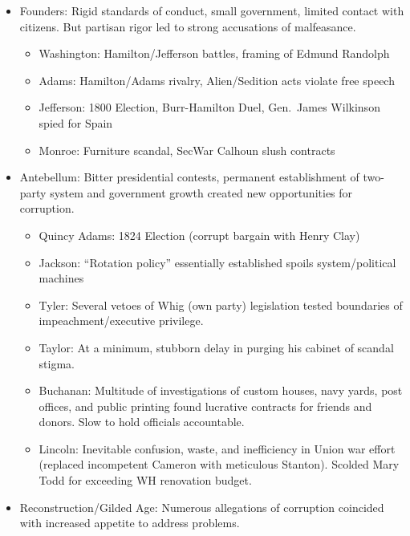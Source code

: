 \documentclass[
]{article}
\begin{document}
\begin{itemize}
\item
  Founders: Rigid standards of conduct, small government, limited
  contact with citizens. But partisan rigor led to strong accusations of
  malfeasance.

  \begin{itemize}
  \item
    Washington: Hamilton/Jefferson battles, framing of Edmund Randolph
  \item
    Adams: Hamilton/Adams rivalry, Alien/Sedition acts violate free
    speech
  \item
    Jefferson: 1800 Election, Burr-Hamilton Duel, Gen.~James Wilkinson
    spied for Spain
  \item
    Monroe: Furniture scandal, SecWar Calhoun slush contracts
  \end{itemize}
\item
  Antebellum: Bitter presidential contests, permanent establishment of
  two-party system and government growth created new opportunities for
  corruption.

  \begin{itemize}
  \item
    Quincy Adams: 1824 Election (corrupt bargain with Henry Clay)
  \item
    Jackson: ``Rotation policy'' essentially established spoils
    system/political machines
  \item
    Tyler: Several vetoes of Whig (own party) legislation tested
    boundaries of impeachment/executive privilege.
  \item
    Taylor: At a minimum, stubborn delay in purging his cabinet of
    scandal stigma.
  \item
    Buchanan: Multitude of investigations of custom houses, navy yards,
    post offices, and public printing found lucrative contracts for
    friends and donors. Slow to hold officials accountable.
  \item
    Lincoln: Inevitable confusion, waste, and inefficiency in Union war
    effort (replaced incompetent Cameron with meticulous Stanton).
    Scolded Mary Todd for exceeding WH renovation budget.
  \end{itemize}
\item
  Reconstruction/Gilded Age: Numerous allegations of corruption
  coincided with increased appetite to address problems.


\end{itemize}
\end{document}
